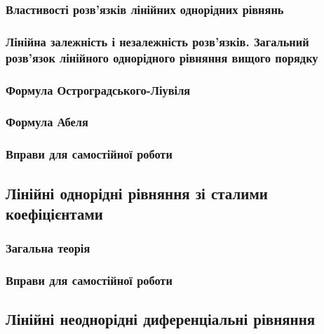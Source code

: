 		\subsubsection{Властивості роз\-в'яз\-ків лінійних однорідних рівнянь}
		

		\subsubsection{Лінійна залежність і незалежність роз\-в'яз\-ків. Загальний роз\-в'яз\-ок лінійного однорідного рівняння вищого порядку}
		

		\subsubsection{Формула Остроградського-Ліувіля}
		

		\subsubsection{Формула Абеля}
		

		\subsubsection{Вправи для самостійної роботи}
		

	\subsection{Лінійні однорідні рівняння зі сталими коефіцієнтами}
	
		\subsubsection{Загальна теорія}
		

		\subsubsection{Вправи для самостійної роботи}
		

	\subsection{Лінійні неоднорідні диференціальні рівняння}
	

